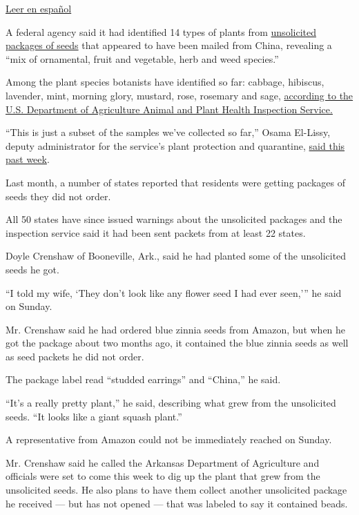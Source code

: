 \href{https://www.nytimes3xbfgragh.onion/es/2020/08/03/espanol/estados-unidos/semillas-correo-china.html}{Leer
en español}

A federal agency said it had identified 14 types of plants from
\href{https://www.nytimes3xbfgragh.onion/2020/07/26/us/seeds-from-china-mail.html}{unsolicited
packages of seeds} that appeared to have been mailed from China,
revealing a ``mix of ornamental, fruit and vegetable, herb and weed
species.''

Among the plant species botanists have identified so far: cabbage,
hibiscus, lavender, mint, morning glory, mustard, rose, rosemary and
sage,
\href{https://www.aphis.usda.gov/publications/plant_health/faq-unsolicited-seeds.pdf}{according
to the U.S. Department of Agriculture Animal and Plant Health Inspection
Service.}

``This is just a subset of the samples we've collected so far,'' Osama
El-Lissy, deputy administrator for the service's plant protection and
quarantine,
\href{https://www.usda.gov/media/radio/daily-newsline/2020-07-29/actuality-unsolicited-seeds-are-several-plant-species}{said
this past week}.

Last month, a number of states reported that residents were getting
packages of seeds they did not order.

All 50 states have since issued warnings about the unsolicited packages
and the inspection service said it had been sent packets from at least
22 states.

Doyle Crenshaw of Booneville, Ark., said he had planted some of the
unsolicited seeds he got.

``I told my wife, `They don't look like any flower seed I had ever
seen,''' he said on Sunday.

Mr. Crenshaw said he had ordered blue zinnia seeds from Amazon, but when
he got the package about two months ago, it contained the blue zinnia
seeds as well as seed packets he did not order.

The package label read ``studded earrings'' and ``China,'' he said.

``It's a really pretty plant,'' he said, describing what grew from the
unsolicited seeds. ``It looks like a giant squash plant.''

A representative from Amazon could not be immediately reached on Sunday.

Mr. Crenshaw said he called the Arkansas Department of Agriculture and
officials were set to come this week to dig up the plant that grew from
the unsolicited seeds. He also plans to have them collect another
unsolicited package he received --- but has not opened --- that was
labeled to say it contained beads.

